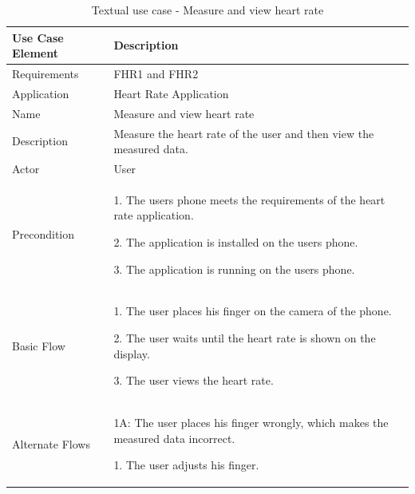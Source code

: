 \begin{table}[h]
\begin{center}
\begin{tabular}{ l | p{10cm} }
  \hline
  \textbf{Use Case Element} & \textbf{Description} \\ \hline\hline
  Requirements & FHR1 and FHR2 \\ \hline
  Application & Heart Rate Application \\ \hline
  Name & Measure and view heart rate \\ \hline
  Description & Measure the heart rate of the user and then view the measured data. \\ \hline
  Actor & User \\ \hline
  Precondition &
    \par 1. The users phone meets the requirements of the heart rate application.
  	\par 2. The application is installed on the users phone.
  	\par 3. The application is running on the users phone.
  \\ \hline
  Basic Flow & 
  	\par 1. The user places his finger on the camera of the phone.
  	\par 2. The user waits until the heart rate is shown on the display.
  	\par 3. The user views the heart rate.
  \\ \hline
  Alternate Flows & 
  	\par 1A: The user places his finger wrongly, which makes the measured data incorrect.
  	\par\hspace{15pt} 1. The user adjusts his finger.
  \\ \hline
\end{tabular}
\end{center}
\caption{Textual use case - Measure and view heart rate}
\label{table:use-case-measure-heart-rate}
\end{table}

